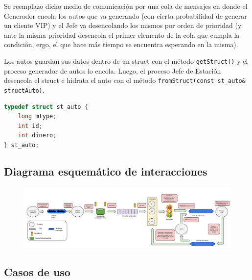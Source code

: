 \documentclass[12pt,a4paper,spanish]{article}
\begin{document}
	Se reemplazo dicho medio de comunicación por una cola de mensajes en donde el Generador encola los autos que va generando 
	(con cierta probabilidad de generar un cliente VIP) y el Jefe va desencolando los mismos por orden de prioridad (y ante la misma prioridad desencola el primer elemento de la cola que cumpla la condición, ergo, el que hace más tiempo se encuentra 
	esperando en la misma).

	Los autos guardan sus datos dentro de un struct con el método \texttt{getStruct()} y el proceso generador de autos lo encola.
	Luego, el proceso Jefe de Estación desencola el struct e hidrata el auto con el método \texttt{fromStruct(const st\_auto\& structAuto)}.

\begin{center}
		\begin{varwidth}{0.5\textwidth}
			\begin{lstlisting}[frame=single, language=C, caption={Autos encoladas}]
	typedef struct st_auto {
	long mtype;
	int id;	
	int dinero;
} st_auto;
		\end{lstlisting}
	\end{varwidth}
\end{center}
	\newpage
	\subsection{Diagrama esquemático de interacciones}
	
	\begin{figure}[h]
	\includegraphics[angle=90, scale = 0.27]{esquema_2.png}
	\centering
	\end{figure}

	\newpage
	\subsection{Casos de uso}
\end{document}
